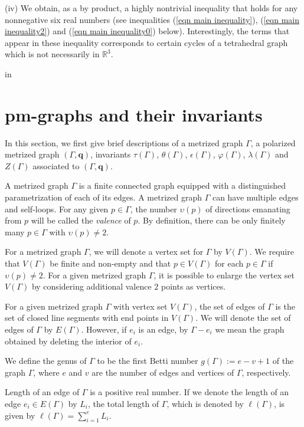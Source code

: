 \documentclass[12pt]{amsart}
\theoremstyle{example}
\theoremstyle{definition}
\theoremstyle{notation}
\begin{document}
(iv) We obtain, as a by product, a highly nontrivial inequality that holds for any nonnegative six real numbers (see inequalities (\ref{eqn main inequality}), (\ref{eqn main inequality2}) and (\ref{eqn main inequality0}) below). Interestingly, the terms that appear in these inequality corresponds to certain cycles of a tetrahedral graph which is not necessarily in ${{\mathbb R}}^3$.

 in
\section{pm-graphs and their invariants}\label{sec pm-graphs}

In this section, we first give brief descriptions of a metrized graph ${\Gamma}$, a polarized metrized graph $({\Gamma},{\textbf{q}})$, invariants ${\tau(\Gamma)}$, ${\theta ({\Gamma})}$, ${\epsilon({\Gamma})}$, ${\varphi ({\Gamma})}$, ${\lambda ({\Gamma})}$ and $Z({\Gamma})$ associated to $({\Gamma},{\textbf{q}})$.

A metrized graph ${\Gamma}$ is a finite connected graph equipped with a distinguished parametrization of each of its edges.
A metrized graph ${\Gamma}$ can have multiple edges and self-loops.
For any given $p \in {\Gamma}$,
the number ${\upsilon}(p)$ of directions emanating from $p$ will be called the \textit{valence} of $p$.
By definition, there can be only finitely many $p \in {\Gamma}$ with ${\upsilon}(p)\not=2$.

For a metrized graph ${\Gamma}$, we will denote a vertex set for ${\Gamma}$ by ${V({\Gamma})}$.
We require that ${V({\Gamma})}$ be finite and non-empty and that $p \in {V({\Gamma})}$ for each $p \in {\Gamma}$ if ${\upsilon}(p)\not=2$. For a given metrized graph ${\Gamma}$, it is possible to enlarge the
vertex set ${V({\Gamma})}$ by considering additional valence $2$ points as vertices.

For a given metrized graph ${\Gamma}$ with vertex set ${V({\Gamma})}$, the set of edges of ${\Gamma}$ is the set of closed line segments with end points in ${V({\Gamma})}$. We will denote the set of edges of ${\Gamma}$ by ${E({\Gamma})}$. However, if
$e_i$ is an edge, by ${\Gamma}-e_i$ we mean the graph obtained by deleting the interior of $e_i$.

We define the genus of ${\Gamma}$ to be the first Betti number $g({\Gamma}):=e-v+1$ of the graph ${\Gamma}$, where $e$ and $v$ are the number of edges and vertices of ${\Gamma}$, respectively.

Length of an edge of ${\Gamma}$ is a positive real number. If we denote the length of an edge $e_i \in {E({\Gamma})}$ by ${L_{i}}$, the total length of ${\Gamma}$, which is denoted by ${\ell ({\Gamma})}$, is given by ${\ell ({\Gamma})}=\sum_{i=1}^e{L_{i}}$.
\end{document}
